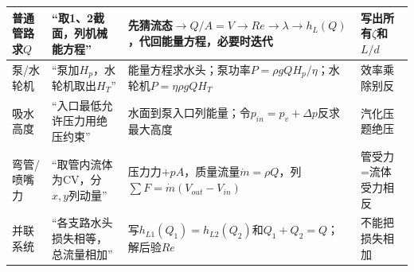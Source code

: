 \documentclass[UTF8,a4paper]{ctexart}
\begin{document}
\begin{tabular}{|L{0.16\textwidth}|L{0.25\textwidth}|L{0.36\textwidth}|L{0.18\textwidth}|}\hline
普通管路求$Q$ & “取1、2截面，列机械能方程” & 先猜流态$\to Q/A=V\to Re\to\lambda\to h_L(Q)$，代回能量方程，必要时迭代 & 写出所有$\zeta$和$L/d$\\\hline
泵/水轮机 & “泵加$H_p$，水轮机取出$H_T$” & 能量方程求水头；泵功率$P=\rho gQH_p/\eta$；水轮机$P=\eta\rho gQH_T$ & 效率乘除别反\\\hline
吸水高度 & “入口最低允许压力用绝压约束” & 水面到泵入口列能量；令$p_{in}=p_v+\Delta p$反求最大高度 & 汽化压题绝压\\\hline
弯管/喷嘴力 & “取管内流体为CV，分$x,y$列动量” & 压力力$+pA$，质量流量$\dot m=\rho Q$，列$\sum F=\dot m(V_{out}-V_{in})$ & 管受力=流体受力相反\\\hline
并联系统 & “各支路水头损失相等，总流量相加” & 写$h_{L1}(Q_1)=h_{L2}(Q_2)$和$Q_1+Q_2=Q$；解后验$Re$ & 不能把损失相加\\\hline
\end{tabular}
\newpage
\end{document}
